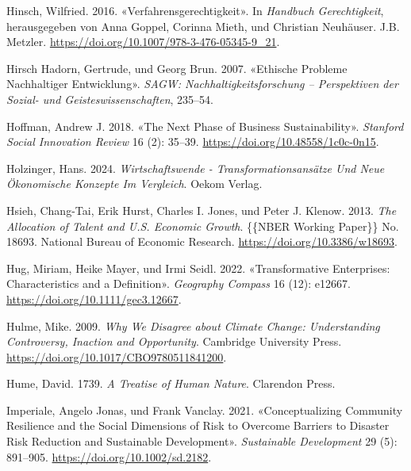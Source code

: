 \documentclass[
  nswissgerman,
  a4paper,
  openany]{book}
\newlength{\cslhangindent}
\newenvironment{CSLReferences}[2] %
 {\begin{list}{}{%
  \setlength{\itemindent}{0pt}
  \setlength{\leftmargin}{0pt}
  \setlength{\parsep}{0pt}
  \ifodd #1
   \setlength{\leftmargin}{\cslhangindent}
   \setlength{\itemindent}{-1\cslhangindent}
  \fi
  \setlength{\itemsep}{#2\baselineskip}}}
 {\end{list}}
\begin{document}
\begin{CSLReferences}{1}{1}
Hinsch, Wilfried. 2016. {«{Verfahrensgerechtigkeit}»}. In
\emph{{Handbuch Gerechtigkeit}}, herausgegeben von Anna Goppel, Corinna
Mieth, und Christian Neuhäuser. J.B. Metzler.
\url{https://doi.org/10.1007/978-3-476-05345-9_21}.

Hirsch Hadorn, Gertrude, und Georg Brun. 2007. {«Ethische {Probleme}
Nachhaltiger {Entwicklung}»}. \emph{SAGW: Nachhaltigkeitsforschung --
Perspektiven der Sozial- und Geisteswissenschaften}, 235--54.

Hoffman, Andrew J. 2018. {«The {Next Phase} of {Business
Sustainability}»}. \emph{Stanford Social Innovation Review} 16 (2):
35--39. \url{https://doi.org/10.48558/1c0c-0n15}.

Holzinger, Hans. 2024. \emph{Wirtschaftswende -
{Transformationsans{ä}tze} Und Neue {Ö}konomische {Konzepte} Im
{Vergleich}}. Oekom Verlag.

Hsieh, Chang-Tai, Erik Hurst, Charles I. Jones, und Peter J. Klenow.
2013. \emph{The {Allocation} of {Talent} and {U}.{S}. {Economic
Growth}}. \{\{NBER Working Paper\}\} No. 18693. National Bureau of
Economic Research. \url{https://doi.org/10.3386/w18693}.

Hug, Miriam, Heike Mayer, und Irmi Seidl. 2022. {«Transformative
Enterprises: {Characteristics} and a Definition»}. \emph{Geography
Compass} 16 (12): e12667. \url{https://doi.org/10.1111/gec3.12667}.

Hulme, Mike. 2009. \emph{Why {We Disagree} about {Climate Change}:
{Understanding Controversy}, {Inaction} and {Opportunity}}. Cambridge
University Press. \url{https://doi.org/10.1017/CBO9780511841200}.

Hume, David. 1739. \emph{A {Treatise} of {Human Nature}}. Clarendon
Press.

Imperiale, Angelo Jonas, und Frank Vanclay. 2021. {«Conceptualizing
Community Resilience and the Social Dimensions of Risk to Overcome
Barriers to Disaster Risk Reduction and Sustainable Development»}.
\emph{Sustainable Development} 29 (5): 891--905.
\url{https://doi.org/10.1002/sd.2182}.


\end{CSLReferences}
\end{document}
